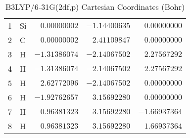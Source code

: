 \documentclass[10pt,oneside]{article}
\begin{document}
\begin{table}[h!]
\centering
\caption{B3LYP/6-31G(2df,p) Cartesian Coordinates (Bohr)}
\begin{tabular}{llrrr}
1  & Si & $ 0.00000002$ & $-1.14400635$ & $ 0.00000000$ \\
2  & C  & $ 0.00000002$ & $ 2.41109847$ & $ 0.00000000$ \\
3  & H  & $-1.31386074$ & $-2.14067502$ & $ 2.27567292$ \\
4  & H  & $-1.31386074$ & $-2.14067502$ & $-2.27567292$ \\
5  & H  & $ 2.62772096$ & $-2.14067502$ & $ 0.00000000$ \\
6  & H  & $-1.92762657$ & $ 3.15692280$ & $ 0.00000000$ \\
7  & H  & $ 0.96381323$ & $ 3.15692280$ & $-1.66937364$ \\
8  & H  & $ 0.96381323$ & $ 3.15692280$ & $ 1.66937364$ \\
\end{tabular}
\end{table}

\clearpage
\end{document}
